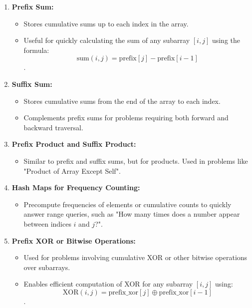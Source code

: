 \begin{enumerate}
    \item \textbf{Prefix Sum:} 
    \begin{itemize}
        \item Stores cumulative sums up to each index in the array.
        \item Useful for quickly calculating the sum of any subarray \( [i, j] \) using the formula:
        \[
        \text{sum}(i, j) = \text{prefix}[j] - \text{prefix}[i-1]
        \]
        .
    \end{itemize}
    
    \item \textbf{Suffix Sum:} 
    \begin{itemize}
        \item Stores cumulative sums from the end of the array to each index.
        \item Complements prefix sums for problems requiring both forward and backward traversal.
    \end{itemize}
    
    \item \textbf{Prefix Product and Suffix Product:}
    \begin{itemize}
        \item Similar to prefix and suffix sums, but for products. Used in problems like "Product of Array Except Self".
    \end{itemize}
    
    \item \textbf{Hash Maps for Frequency Counting:}
    \begin{itemize}
        \item Precompute frequencies of elements or cumulative counts to quickly answer range queries, such as "How many times does a number appear between indices \( i \) and \( j \)?".
    \end{itemize}
    
    \item \textbf{Prefix XOR or Bitwise Operations:}
    \begin{itemize}
        \item Used for problems involving cumulative XOR or other bitwise operations over subarrays.
        \item Enables efficient computation of XOR for any subarray \( [i, j] \) using:
        \[
        \text{XOR}(i, j) = \text{prefix\_xor}[j] \oplus \text{prefix\_xor}[i-1]
        \]
        .
    \end{itemize}
\end{enumerate}
